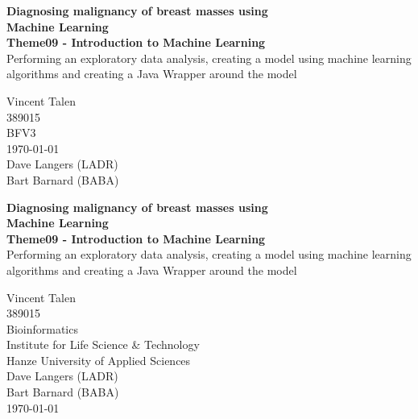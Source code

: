 

\begin{center}
  \topskip=45pt
  \LARGE{\textbf{Diagnosing malignancy of breast masses using\\Machine Learning}}\\
  \vspace*{20pt}
  \large{\textbf{Theme09 - Introduction to Machine Learning}}\\
  \large{Performing an exploratory data analysis, creating a model using machine learning algorithms and creating a Java Wrapper around the model}\\
  \vspace*{40pt}
\end{center}
\vspace*{\fill}
\begin{flushright}
  Vincent Talen\\
  389015\\
  BFV3\\
  \today\\
  Dave Langers (LADR)\\
  Bart Barnard (BABA)\\
\end{flushright}


\newpage
\null


\newpage
\begin{center}
  \topskip=45pt
  \LARGE{\textbf{Diagnosing malignancy of breast masses using\\Machine Learning}}\\
  \vspace*{20pt}
  \large{\textbf{Theme09 - Introduction to Machine Learning}}\\
  \large{Performing an exploratory data analysis, creating a model using machine learning algorithms and creating a Java Wrapper around the model}\\
\end{center}
\vspace*{\fill}
\begin{flushright}
  Vincent Talen\\
  389015\\
  Bioinformatics\\
  Institute for Life Science \& Technology\\
  Hanze University of Applied Sciences\\
  Dave Langers (LADR)\\
  Bart Barnard (BABA)\\
  \today\\
\end{flushright}


